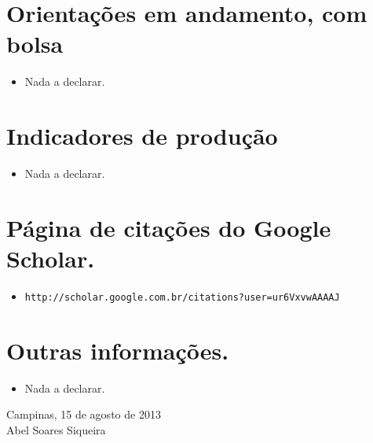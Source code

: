\documentclass[a4paper,11pt]{article}
\begin{document}
\section{Orientações em andamento, com bolsa}
\begin{itemize}
  \item Nada a declarar.
\end{itemize}

\section{Indicadores de produção}
\begin{itemize}
  \item Nada a declarar.
\end{itemize}

\section{Página de citações do Google Scholar.}
\begin{itemize}
  \item \verb+http://scholar.google.com.br/citations?user=ur6VxvwAAAAJ+
\end{itemize}

\section{Outras informações.}
\begin{itemize}
  \item Nada a declarar.
\end{itemize}

\vspace{1cm}
\begin{flushright}
  Campinas, 15 de agosto de 2013 \\
  \vspace{1cm}
  Abel Soares Siqueira
\end{flushright}
\end{document}
